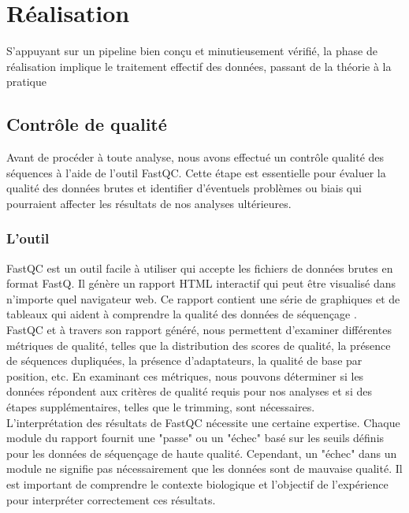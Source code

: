 \chapter{Réalisation}
S'appuyant sur un pipeline bien conçu et minutieusement vérifié, la phase de réalisation implique le traitement effectif des données, passant de la théorie à la pratique
\section{Contrôle de qualité}

Avant de procéder à toute analyse, nous avons effectué un contrôle qualité des séquences à l'aide de l'outil FastQC. Cette étape est essentielle pour évaluer la qualité des données brutes et identifier d'éventuels problèmes ou biais qui pourraient affecter les résultats de nos analyses ultérieures.

\subsection*{L'outil}

FastQC est un outil facile à utiliser qui accepte les fichiers de données brutes en format FastQ. Il génère un rapport HTML interactif qui peut être visualisé dans n'importe quel navigateur web. Ce rapport contient une série de graphiques et de tableaux qui aident à comprendre la qualité des données de séquençage \cite{fastqc, fastQC2}.\\

FastQC et à travers son rapport généré, nous permettent d'examiner différentes métriques de qualité, telles que la distribution des scores de qualité, la présence de séquences dupliquées, la présence d'adaptateurs, la qualité de base par position, etc. En examinant ces métriques, nous pouvons déterminer si les données répondent aux critères de qualité requis pour nos analyses et si des étapes supplémentaires, telles que le trimming, sont nécessaires.\\

L'interprétation des résultats de FastQC nécessite une certaine expertise. Chaque module du rapport fournit une "passe" ou un "échec" basé sur les seuils définis pour les données de séquençage de haute qualité. Cependant, un "échec" dans un module ne signifie pas nécessairement que les données sont de mauvaise qualité. Il est important de comprendre le contexte biologique et l'objectif de l'expérience pour interpréter correctement ces résultats.

